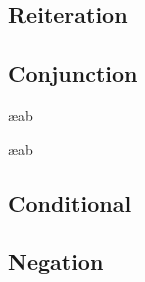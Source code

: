 \begin{multicols}{2}
\subsection*{Reiteration}

\begin{fitchproof}
	 
\end{fitchproof}

\subsection*{Conjunction}

\begin{fitchproof}
	 
\end{fitchproof}
\begin{fitchproof}
	 \ae{ab}
\end{fitchproof}
\begin{fitchproof}
	 \ae{ab}
\end{fitchproof}

\subsection*{Conditional}

\begin{fitchproof}
	\open
		\AS
	\close
\end{fitchproof}
\begin{fitchproof}
	 
\end{fitchproof}

\subsection*{Negation}

\begin{fitchproof}
\open
	\AS
\close
{}
\end{fitchproof}
\begin{fitchproof}
\end{fitchproof}


\end{multicols}
